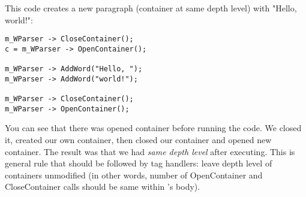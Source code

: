 
This code creates a new paragraph (container at same depth level)
with "Hello, world!":

\begin{verbatim}
m_WParser -> CloseContainer();
c = m_WParser -> OpenContainer();

m_WParser -> AddWord("Hello, ");
m_WParser -> AddWord("world!");

m_WParser -> CloseContainer();
m_WParser -> OpenContainer();
\end{verbatim}

\begin{comment}
and here is image of the situation:

\image{}{hello.bmp}
\end{comment}

You can see that there was opened container before running the code. We closed
it, created our own container, then closed our container and opened
new container. The result was that we had {\it same depth level} after
executing. This is general rule that should be followed by tag handlers:
leave depth level of containers unmodified (in other words, number of
OpenContainer and CloseContainer calls should be same within 's body).

